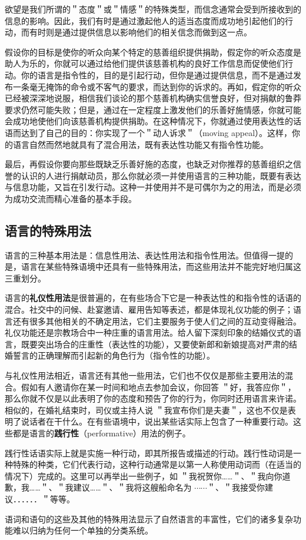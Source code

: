 欲望是我们所谓的＂态度＂或＂情感＂的特殊类型，而信念通常会受到所接收到的信息的影响。因此，我们有时是通过激起他人的适当态度而成功地引起他们的行动，而有时则是通过提供信息以影响他们的相关信念而做到这一点。

假设你的目标是使你的听众向某个特定的慈善组织提供捐助，假定你的听众态度是助人为乐的，你就可以通过给他们提供该慈善机构的良好工作信息而促使他们行动。你的语言是指令性的，目的是引起行动，但你是通过提供信息，而不是通过发布一条毫无掩饰的命令或不客气的要求，而达到你的诉求的。再如，假定你的听众已经被深深地说服，相信我们谈论的那个慈善机构确实信誉良好，但对捐献的鲁莽要求仍然可能失败；但是，通过在一定程度上激发他们的乐善好施情感，你就可能会成功地使他们向该慈善机构提供捐助。在这种情况下，你就通过使用表达性的话语而达到了自己的目的：你实现了一个＂动人诉求＂（moving appeal）。这样，你的语言自然而然地就具有了混合用法，既有表达性功能又有指令性功能。

最后，再假设你要向那些既缺乏乐善好施的态度，也缺乏对你推荐的慈善组织之信誉的认识的人进行捐献动员，那么你就必须一并使用语言的三种功能，既要有表达与信息功能，又旨在引发行动。这种一并使用并不是可偶尔为之的用法，而是必须为成功交流而精心准备的基本手段。

\subsection{语言的特殊用法}

语言的三种基本用法是：信息性用法、表达性用法和指令性用法。但值得一提的是，语言在某些特殊语境中还具有一些特殊用法，而这些用法并不能完好地归属这三重划分。

语言的\textbf{礼仪性用法}是很普遍的，在有些场合下它是一种表达性的和指令性的话语的混合。社交中的问候、赴宴邀请、雇用告知等表述，都是体现礼仪功能的例子；语言还有很多其他相关的不确定用法，它们主要服务于使人们之间的互动变得融洽。礼仪功能还是宗教场合中一种庄重的语言用法。给人留下深刻印象的结婚仪式的语言，既要突出场合的庄重性（表达性的功能），又要使新郎和新娘提高对严肃的结婚誓言的正确理解而引起新的角色行为（指令性的功能）。

与礼仪性用法相近，语言还有其他一些用法，它们也不仅仅是那些主要用法的混合。假如有人邀请你在某一时间和地点去参加会议，你回答 ＂好，我答应你＂，那么你就不仅是以此表明了你的态度和预告了你的行为，你同时还用语言来许诺。相似的，在婚礼结束时，司仪或主持人说 ＂我宣布你们是夫妻＂，这也不仅是表明了说话者在干什么。在有些语境中，说出某些话实际上包含了一种重要行动。这些都是语言的\textbf{践行性}（performative）用法的例子。

践行性话语实际上就是实施一种行动，即其所报告或描述的行动。践行性动词是一种特殊的种类，它们代表行动，这种行动通常是以第一人称使用动词而（在适当的情况下）完成的。这里可以再举出一些例子，如 ＂我祝贺你……＂、＂我向你道歉，我……＂、＂我建议……＂、＂我将这艘船命名为 $\cdots \cdots$＂、＂我接受你建议．．．．．．＂等等。

语词和语句的这些及其他的特殊用法显示了自然语言的丰富性，它们的诸多复杂功能难以归纳为任何一个单独的分类系统。

\begin{center}
\end{center} 